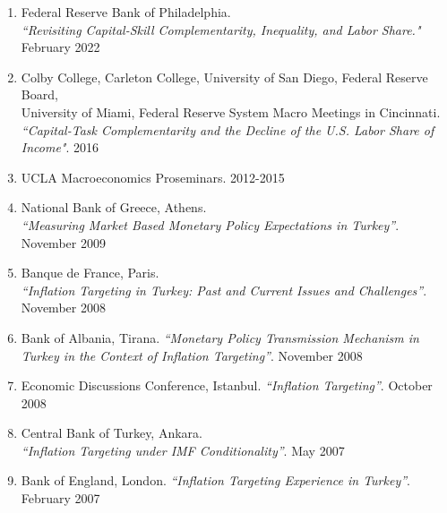 \documentclass[10pt]{article}
\begin{document}
\begin{enumerate}
\item Federal Reserve Bank of Philadelphia. \\
\textit{``Revisiting Capital-Skill Complementarity, Inequality, and Labor Share."}  \hfill                                                February 2022
\item Colby College, Carleton College, University of San Diego, Federal Reserve Board, \\ University of Miami, Federal Reserve System Macro Meetings in Cincinnati.\\
\textit{``Capital-Task Complementarity and the Decline of the U.S. Labor Share of Income"}.                                           \hfill                                                2016
\item UCLA Macroeconomics Proseminars.                                           \hfill                                                2012-2015
\item National Bank of Greece, Athens. \\
\textit{``Measuring Market Based Monetary Policy Expectations in Turkey''}.        \hfill             November 2009
\item Banque de France, Paris. \\
\textit{``Inflation Targeting in Turkey: Past and Current Issues and Challenges''}.   \hfill        November 2008
\item Bank of Albania, Tirana. 
\textit{``Monetary Policy Transmission Mechanism in Turkey in the Context of Inflation Targeting''}.     \hfill                                                                                                 November 2008
\item Economic Discussions Conference, Istanbul. \textit{``Inflation Targeting''}.                      \hfill       October 2008
\item Central Bank of Turkey, Ankara. \\ \textit{``Inflation Targeting under IMF Conditionality''}.   \hfill      May 2007 
\item Bank of England, London. \textit{``Inflation Targeting Experience in Turkey''}.             \hfill       February 2007\medskip
  \end{enumerate}

  
\end{document}
